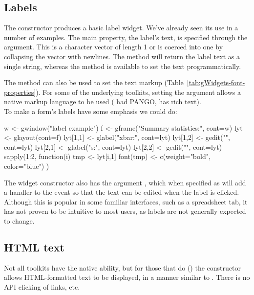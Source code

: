 

\subsection{Labels}
\label{asec:gWidgets-labels}

The  constructor produces a basic label
widget. We've already seen its use in a number of examples. The main
property, the label's text, is specified through the
 argument. This is a character vector of length
1 or is coerced into one by collapsing the vector with newlines. The
 method will return the label text as a single
string, whereas the  method is
available to set the text programmatically.

The  method
can also be used to set the text markup
(Table~\ref{tab:gWidgets-font-properties}).  
For  some of the underlying toolkits, setting the argument
  allows a native markup language
to be used (\GTK\/ had PANGO, \Qt\/ has rich text).
\\

To make a form's labels have some emphasis we could do:
\begin{Schunk}
\begin{Sinput}
 w <- gwindow("label example")
 f <- gframe("Summary statistics:", cont=w)
 lyt <- glayout(cont=f)
 lyt[1,1] <- glabel("xbar:", cont=lyt)
 lyt[1,2] <- gedit("", cont=lyt)
 lyt[2,1] <- glabel("s:", cont=lyt)
 lyt[2,2] <- gedit("", cont=lyt)
 sapply(1:2, function(i) {
   tmp <- lyt[i,1]
   font(tmp) <- c(weight="bold", color="blue")
 })
\end{Sinput}
\end{Schunk}


The widget constructor also has the argument
, which when specified as  will
add a handler to the event so that the text can be edited when the
label is clicked.  Although this is popular in some familiar
interfaces, such as a spreadsheet tab, it has not proven to be
intuitive to most users, as labels are not generally expected to change.

\subsection{HTML text}
\label{sec:html-text}

Not all toolkits have the native ability, but for those that do (\Qt) the
 constructor allows HTML-formatted text to be
displayed, in a manner similar to . There is no
API clicking of links, etc.

